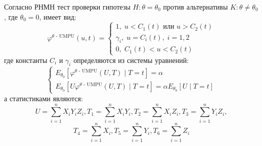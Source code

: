     Согласно \cite{Lehmann1986} РНМН тест проверки гипотезы $H: \theta = \theta_0$ против альтернативы $K: \theta \neq \theta_0$, где $\theta_0=0$, имеет вид:
    $$
    \varphi^{\text{$\theta$ - UMPU}}(u,t)=\begin{cases}
        1, \; u<C_1(t) \text{ или } u>C_2(t)\\
        \gamma_i, \; u=C_i(t), \; i=1,2\\
        0, \; C_1(t)<u<C_2(t)
    \end{cases}
    $$
    где константы $C_i$ и $\gamma_i$ определяются из системы уравнений:
    $$
    \begin{cases}
        E_{\theta_0}[\varphi^{\text{$\theta$ - UMPU}}(U,T) \mid T=t]=\alpha \\
        E_{\theta_0}[U\varphi^{\text{$\theta$ - UMPU}}(U,T) \mid T=t]=\alpha E_{\theta_0}[U \mid T=t]
    \end{cases}
    $$
    а статистиками являются:
    $$
        U = \sum_{i=1}^n X_i Y_i Z_i,
        T_1 = \sum_{i=1}^n X_i Y_i,
        T_2 = \sum_{i=1}^n X_i Z_i,
        T_3 = \sum_{i=1}^n Y_i Z_i,
    $$
    $$
        T_4 = \sum_{i=1}^n X_i,
        T_5 = \sum_{i=1}^n Y_i,
        T_6 = \sum_{i=1}^n Z_i
    $$
    
